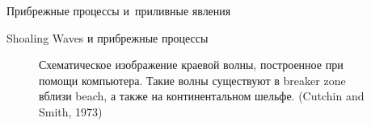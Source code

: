 \begin{chapter}{Прибрежные процессы и~приливные явления}
\begin{section}{Shoaling Waves и прибрежные процессы}
\begin{figure}[h!]
\caption{Схематическое изображение краевой волны, построенное при помощи
компьютера. Такие волны существуют в breaker zone вблизи beach,
а также на континентальном шельфе. (Cutchin and Smith, 1973)}
\label{fig:edgewave}
\end{figure}
%
%
\end{section}


\end{chapter}
